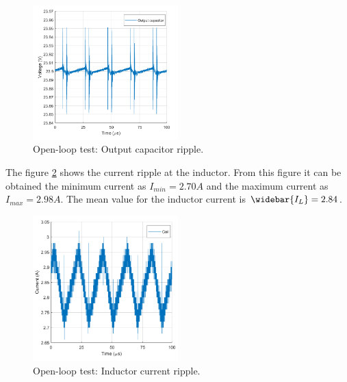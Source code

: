 \begin{figure}[H]
	\begin{center}
		\includegraphics[width=0.5\textwidth]{../Pictures/P1/Test/Openloopoutputcapacitor}
		\caption{Open-loop test: Output capacitor ripple.}
		\label{Openlooptestoutputtcapacitor}
	\end{center}	
\end{figure}

The figure \ref{Openlooptestinductor} shows the current ripple at the inductor. From this figure it can be obtained  the minimum current as $I_{min} = 2.70A$ and the maximum current as $I_{max} = 2.98A$. The mean value for the inductor current is $\widebar{I_L}= 2.84$.

\begin{figure}[H]
	\begin{center}
		\includegraphics[width=0.5\textwidth]{../Pictures/P1/Test/Openloopinductor}
		\caption{Open-loop test: Inductor current ripple.}
		\label{Openlooptestinductor}
	\end{center}	
\end{figure}